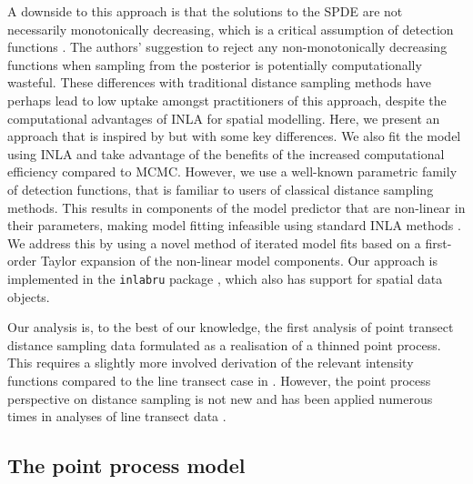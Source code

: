 \documentclass{statsoc}
\begin{document}
A downside to this approach is that the solutions to the SPDE are not necessarily monotonically decreasing, which is a critical assumption of detection functions \citep{buckland_distance_2015}. The authors' suggestion to reject any non-monotonically decreasing functions when sampling from the posterior is potentially computationally wasteful. These differences with traditional distance sampling methods have perhaps lead to low uptake amongst practitioners of this approach, despite the computational advantages of INLA for spatial modelling. Here, we present an approach that is inspired by \citet{yuan_point_2017} but with some key differences. We also fit the model using INLA and take advantage of the benefits of the increased computational efficiency compared to MCMC.  However, we use a well-known parametric family of detection functions, that is familiar to users of classical distance sampling methods. This results in components of the model predictor that are non-linear in their parameters, making model fitting infeasible using standard INLA methods \citep{rue_approximate_2009}.  We address this by using a novel method of iterated model fits based on a first-order Taylor expansion of the non-linear model components.  Our approach is implemented in the \texttt{inlabru} package \citep{lindgren_inlabru_2024, bachl_inlabru_2019}, which also has support for spatial data objects.

Our analysis is, to the best of our knowledge, the first analysis of point transect distance sampling data formulated as a realisation of a thinned point process.  This requires a slightly more involved derivation of the relevant intensity functions compared to the line transect case in \cite{yuan_point_2017}. However, the point process perspective on distance sampling is not new and has been applied numerous times in analyses of line transect data \citep{buckland_model-based_2016, niemi_bayesian_2010, johnson_model-based_2010, waagepetersen_likelihood-based_2006, hedley_spatial_2004,  hogmander_random_1991, stoyan_remark_1982}.

\subsection{The point process model}
\end{document}
